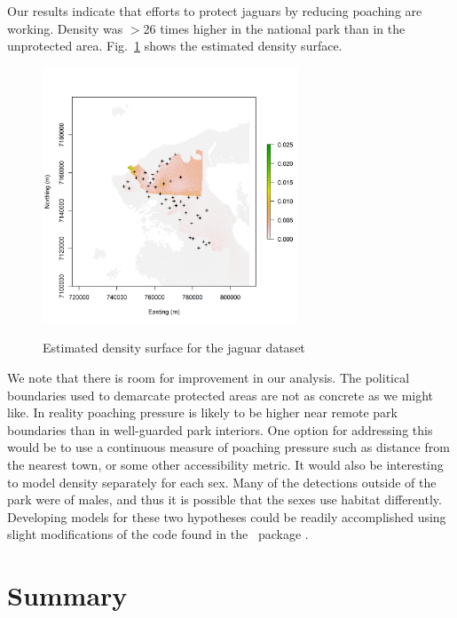 Our results
indicate that efforts to protect jaguars by reducing poaching are
working. Density was $>$26 times higher in the national park than in the
unprotected area. Fig.~\ref{ch9:fig:Dsurface} shows the estimated
density surface.

\begin{figure}[ht]
\centering
\includegraphics[width=3in,height=3in]{Ch11/figs/Dsurface34}
\label{ch9:fig:Dsurface}
\caption{Estimated density surface for the jaguar dataset}
\end{figure}


We note that there is room for improvement in our analysis. The
political boundaries used to demarcate protected areas are not as
concrete as we might like. In reality poaching pressure is likely to
be higher near remote park boundaries than in well-guarded park
interiors. One option
for addressing this would be to use a continuous measure of poaching
pressure such as distance from the nearest town, or some other
accessibility metric. It would also be interesting to model density
separately for each sex. Many of the detections outside of the park
were of males, and thus it is possible that the sexes use habitat
differently. Developing models for these two hypotheses could be
readily accomplished using slight modifications of the code found in
the \R~package \scrbook.



\section{Summary}

